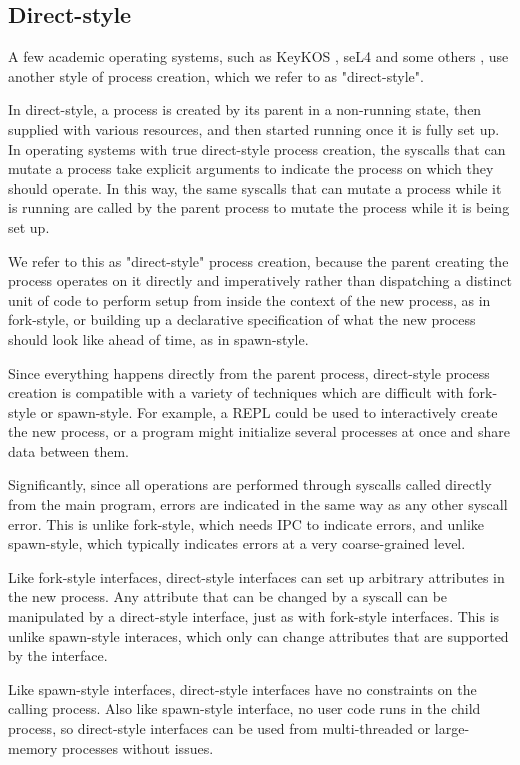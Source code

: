 \documentclass[letterpaper,twocolumn,10pt]{article}
\begin{document}
\subsection{Direct-style}
A few academic operating systems, such as KeyKOS \cite{keykos}, seL4 \cite{sel4}
and some others \cite{exokernel} \cite{fuschia} \cite{singularity},
use another style of process creation, which we refer to as "direct-style".

In direct-style, a process is created by its parent in a non-running state,
then supplied with various resources,
and then started running once it is fully set up.
In operating systems with true direct-style process creation,
the syscalls that can mutate a process
take explicit arguments to indicate the process on which they should operate.
In this way, the same syscalls that can mutate a process while it is running
are called by the parent process to mutate the process while it is being set up.

We refer to this as "direct-style" process creation,
because the parent creating the process operates on it directly and imperatively
rather than dispatching a distinct unit of code to perform setup from inside the context of the new process,
as in fork-style,
or building up a declarative specification of what the new process should look like ahead of time,
as in spawn-style.

Since everything happens directly from the parent process,
direct-style process creation is compatible with a variety of techniques
which are difficult with fork-style or spawn-style.
For example, a REPL could be used to interactively create the new process,
or a program might initialize several processes at once and share data between them.

Significantly,
since all operations are performed through syscalls called directly from the main program,
errors are indicated in the same way as any other syscall error.
This is unlike fork-style, which needs IPC to indicate errors,
and unlike spawn-style, which typically indicates errors at a very coarse-grained level.

Like fork-style interfaces,
direct-style interfaces can set up arbitrary attributes in the new process.
Any attribute that can be changed by a syscall
can be manipulated by a direct-style interface,
just as with fork-style interfaces.
This is unlike spawn-style interaces,
which only can change attributes that are supported by the interface.

Like spawn-style interfaces,
direct-style interfaces have no constraints on the calling process.
Also like spawn-style interface,
no user code runs in the child process, so
direct-style interfaces can be used from multi-threaded or large-memory processes without issues.
\end{document}
